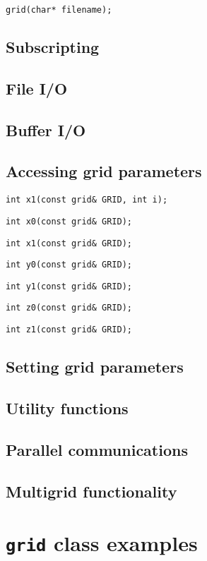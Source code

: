 {\tt grid(char* filename);}


\subsection{Subscripting}


\subsection{File I/O}

\subsection{Buffer I/O}


\subsection{Accessing grid parameters}


{\tt int x1(const grid\& GRID, int i);}

{\tt int x0(const grid\& GRID);}

{\tt int x1(const grid\& GRID);}

{\tt int y0(const grid\& GRID);}

{\tt int y1(const grid\& GRID);}

{\tt int z0(const grid\& GRID);}

{\tt int z1(const grid\& GRID);}


\subsection{Setting grid parameters}


\subsection{Utility functions}


\subsection{Parallel communications}

\subsection{Multigrid functionality}


\section{{\tt grid} class examples}

